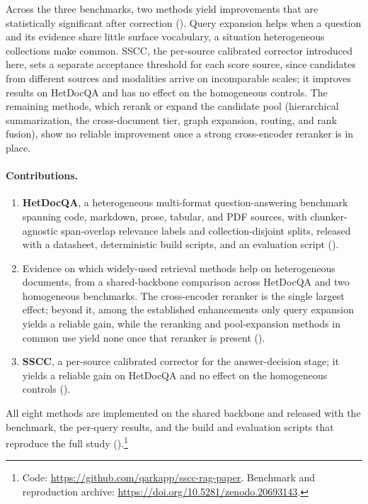 \documentclass[10pt,twocolumn]{article}
\begin{document}
Across the three benchmarks, two methods yield improvements that are
statistically significant after correction (). Query expansion helps when a question and its
evidence share little surface vocabulary, a situation heterogeneous collections
make common. SSCC, the per-source calibrated corrector introduced here, sets a
separate acceptance threshold for each score source, since candidates from
different sources and modalities arrive on incomparable scales; it improves
results on HetDocQA and has no effect on the homogeneous controls. The remaining
methods, which rerank or expand the candidate pool (hierarchical
summarization, the cross-document tier, graph expansion, routing, and rank
fusion), show no reliable improvement once a strong cross-encoder reranker is in
place.

\paragraph{Contributions.}
\begin{enumerate}[leftmargin=1.4em,itemsep=2pt,topsep=2pt]
\item \textbf{HetDocQA}, a heterogeneous multi-format question-answering
benchmark spanning code, markdown, prose, tabular, and PDF sources, with
chunker-agnostic span-overlap relevance labels and collection-disjoint splits,
released with a datasheet, deterministic build scripts, and an evaluation script
().
\item Evidence on which widely-used retrieval methods help on heterogeneous
documents, from a shared-backbone comparison across HetDocQA and two homogeneous
benchmarks. The cross-encoder reranker is the single largest effect; beyond it,
among the established enhancements only query expansion yields a reliable gain,
while the reranking and pool-expansion methods in common use yield none once that
reranker is present ().
\item \textbf{SSCC}, a per-source calibrated corrector for the answer-decision
stage; it yields a reliable gain on HetDocQA and no effect on the homogeneous
controls ().
\end{enumerate}

\noindent All eight methods are implemented on the shared backbone and released
with the benchmark, the per-query results, and the build and evaluation scripts
that reproduce the full study ().\footnote{Code:
\url{https://github.com/qarkapp/sscc-rag-paper}. Benchmark and reproduction
archive: \url{https://doi.org/10.5281/zenodo.20693143}.}
\end{document}

